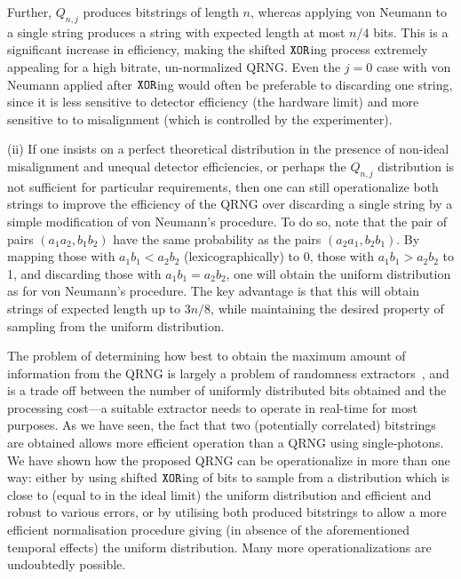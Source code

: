 \documentclass{mscs}
\begin{document}
Further, $Q_{n,j}$ produces bitstrings of length $n$, whereas applying von Neumann to a single string produces a string with expected length at most $n/4$ bits.
This is a significant increase in efficiency, making the shifted ${\tt XOR}$ing process extremely appealing for a high bitrate, un-normalized QRNG.
Even the $j=0$ case with von Neumann applied after ${\tt XOR}$ing would often be preferable to discarding one string, since it is less sensitive to detector efficiency (the hardware limit) and more sensitive to to misalignment (which is controlled by the experimenter).

(ii) If one insists on a perfect theoretical distribution in the presence of non-ideal misalignment and unequal detector efficiencies, or perhaps the $Q_{n,j}$ distribution is not sufficient for particular requirements, then one can still operationalize both strings to improve the efficiency of the QRNG over discarding a single string by a simple modification of von Neumann's procedure. To do so, note that the pair of pairs $(a_1 a_2, b_1 b_2)$ have the same probability as the pairs $(a_2 a_1, b_2 b_1)$. By mapping those with $a_1 b_1 < a_2 b_2$ (lexicographically)  to $0$, those with $a_1 b_1 > a_2 b_2$ to 1, and discarding those with $a_1 b_1 = a_2 b_2$, one will obtain the uniform distribution as for von Neumann's procedure. The key advantage is that this will obtain strings of expected length up to $3n/8$, while maintaining the desired property of sampling from the  uniform distribution.

The problem of determining how best to obtain the maximum amount of information from the QRNG is largely a problem of randomness extractors~\citep{Gabizon:2010uq}, and is a trade off between the number of uniformly distributed bits obtained and the processing cost---a suitable extractor needs to operate in real-time for most purposes. As we have seen, the fact that two (potentially correlated) bitstrings are obtained allows more efficient operation than a QRNG using single-photons. We have shown how the proposed QRNG can be operationalize in more than one way: either by using shifted ${\tt XOR}$ing of bits to sample from a distribution which is close to (equal to in the ideal limit) the uniform distribution and efficient and robust to various errors, or by utilising both produced bitstrings to allow a more efficient normalisation procedure giving (in absence of the aforementioned temporal effects) the uniform distribution. Many more operationalizations are undoubtedly possible.
\end{document}
